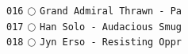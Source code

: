 \documentclass[a4paper,landscape]{article}
\begin{document}
\begin{multicols*}{5}
\texttt{016} \(\bigcirc\)  \texttt{Grand Admiral Thrawn - Pa} \vspace{-0.3mm}\\ 
\texttt{017} \(\bigcirc\)  \texttt{Han Solo - Audacious Smug} \vspace{-0.3mm}\\ 
\texttt{018} \(\bigcirc\)  \texttt{Jyn Erso - Resisting Oppr} \vspace{-0.3mm}\\ 

\end{multicols*}
\end{document}

